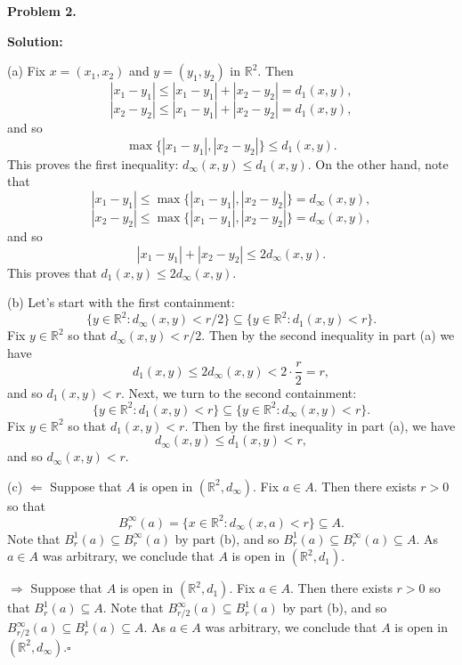 \documentclass[12pt]{article}
\begin{document}
\newpage

\begin{tcolorbox}[
  enhanced, breakable,
  colback  = solgreen,
  colframe = green!45!black,
  fonttitle = \bfseries,
  title = {\textsc{Official Solution}\hfill Homework 8 -- Selected Solutions}
]
\textbf{Problem 2.}

\medskip\textbf{Solution:}

\medskip
(a) Fix $x = (x_1, x_2)$ and $y = (y_1, y_2)$ in $\mathbb{R}^2$. Then
\[
  |x_1-y_1| \le |x_1-y_1| + |x_2-y_2| = d_1(x, y),
\]
\[
  |x_2-y_2| \le |x_1-y_1| + |x_2-y_2| = d_1(x, y),
\]
and so
\[
  \max\{|x_1-y_1|, |x_2-y_2|\} \le d_1(x, y).
\]
This proves the first inequality: $d_\infty(x, y) \le d_1(x, y)$. On the other hand, note that
\[
  |x_1-y_1| \le \max\{|x_1-y_1|, |x_2-y_2|\} = d_\infty(x, y),
\]
\[
  |x_2-y_2| \le \max\{|x_1-y_1|, |x_2-y_2|\} = d_\infty(x, y),
\]
and so
\[
  |x_1-y_1| + |x_2-y_2| \le 2d_\infty(x, y).
\]
This proves that $d_1(x, y) \le 2d_\infty(x, y)$.

\medskip
(b) Let's start with the first containment:
\[
  \{y \in \mathbb{R}^2 : d_\infty(x, y) < r/2\} \subseteq \{y \in \mathbb{R}^2 : d_1(x, y) < r\}.
\]
Fix $y \in \mathbb{R}^2$ so that $d_\infty(x, y) < r/2$. Then by the second inequality in part (a) we have
\[
  d_1(x, y) \le 2d_\infty(x, y) < 2 \cdot \frac{r}{2} = r,
\]
and so $d_1(x, y) < r$.
Next, we turn to the second containment:
\[
  \{y \in \mathbb{R}^2 : d_1(x, y) < r\} \subseteq \{y \in \mathbb{R}^2 : d_\infty(x, y) < r\}.
\]
Fix $y \in \mathbb{R}^2$ so that $d_1(x, y) < r$. Then by the first inequality in part (a), we have
\[
  d_\infty(x, y) \le d_1(x, y) < r,
\]
and so $d_\infty(x, y) < r$.

\medskip
(c) $\Longleftarrow$ Suppose that $A$ is open in $(\mathbb{R}^2, d_\infty)$. Fix $a \in A$. Then there exists $r > 0$ so
that
\[
  B_r^\infty(a) = \{x \in \mathbb{R}^2 : d_\infty(x, a) < r\} \subseteq A.
\]
Note that $B_r^1(a) \subseteq B_r^\infty(a)$ by part (b), and so $B_r^1(a) \subseteq B_r^\infty(a) \subseteq A$. As
$a \in A$ was arbitrary, we conclude that $A$ is open in $(\mathbb{R}^2, d_1)$.

\medskip
$\Longrightarrow$ Suppose that $A$ is open in $(\mathbb{R}^2, d_1)$. Fix $a \in A$. Then there exists $r > 0$ so that
$B_r^1(a) \subseteq A$. Note that $B_{r/2}^\infty(a) \subseteq B_r^1(a)$ by part (b), and so
$B_{r/2}^\infty(a) \subseteq B_r^1(a) \subseteq A$. As $a \in A$ was arbitrary, we conclude that $A$ is open in
$(\mathbb{R}^2, d_\infty)$.\hfill$\square$
\end{tcolorbox}
\end{document}
